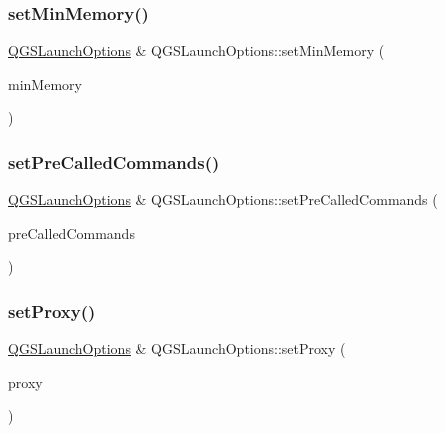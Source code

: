 \mbox{\label{class_q_g_s_launch_options_a9829e05bc487208389b7370dfa1b1f47}} 
\subsubsection{\texorpdfstring{set\+Min\+Memory()}{setMinMemory()}}
{\footnotesize\ttfamily \mbox{\hyperlink{class_q_g_s_launch_options}{Q\+G\+S\+Launch\+Options}} \& Q\+G\+S\+Launch\+Options\+::set\+Min\+Memory (\begin{DoxyParamCaption}\item[{const int}]{min\+Memory }\end{DoxyParamCaption})}

\mbox{\label{class_q_g_s_launch_options_a431ecc151cb9aeff0dc2e72e923c9b57}} 
\subsubsection{\texorpdfstring{set\+Pre\+Called\+Commands()}{setPreCalledCommands()}}
{\footnotesize\ttfamily \mbox{\hyperlink{class_q_g_s_launch_options}{Q\+G\+S\+Launch\+Options}} \& Q\+G\+S\+Launch\+Options\+::set\+Pre\+Called\+Commands (\begin{DoxyParamCaption}\item[{const Q\+String \&}]{pre\+Called\+Commands }\end{DoxyParamCaption})}

\mbox{\label{class_q_g_s_launch_options_abe63245317016695207797345f0cae14}} 
\subsubsection{\texorpdfstring{set\+Proxy()}{setProxy()}}
{\footnotesize\ttfamily \mbox{\hyperlink{class_q_g_s_launch_options}{Q\+G\+S\+Launch\+Options}} \& Q\+G\+S\+Launch\+Options\+::set\+Proxy (\begin{DoxyParamCaption}\item[{const Q\+Network\+Proxy \&}]{proxy }\end{DoxyParamCaption})}

